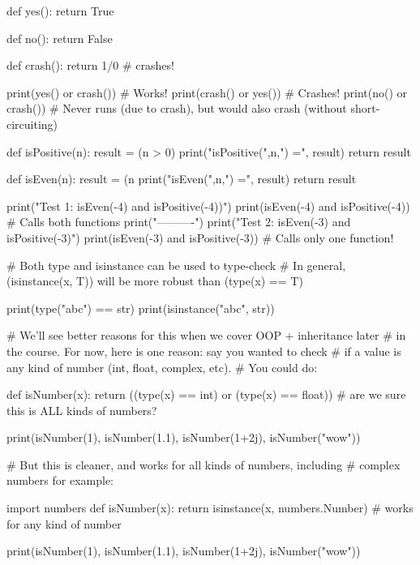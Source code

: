 \begin{runpython}
def yes():
    return True

def no():
    return False

def crash():
    return 1/0 # crashes!

print(yes() or crash()) # Works!
print(crash() or yes()) # Crashes!
print(no() or crash())  # Never runs (due to crash), but would also crash (without short-circuiting)
\end{runpython}

\begin{runpython}
def isPositive(n):
    result = (n > 0)
    print("isPositive(",n,") =", result)
    return result

def isEven(n):
    result = (n %
    print("isEven(",n,") =", result)
    return result

print("Test 1: isEven(-4) and isPositive(-4))")
print(isEven(-4) and isPositive(-4)) # Calls both functions
print("----------")
print("Test 2: isEven(-3) and isPositive(-3)")
print(isEven(-3) and isPositive(-3)) # Calls only one function!
\end{runpython}

\begin{runpython}
# Both type and isinstance can be used to type-check
# In general, (isinstance(x, T)) will be more robust than (type(x) == T)

print(type("abc") == str)
print(isinstance("abc", str))

# We'll see better reasons for this when we cover OOP + inheritance later
# in the course.  For now, here is one reason:  say you wanted to check
# if a value is any kind of number (int, float, complex, etc). 
# You could do:

def isNumber(x):
    return ((type(x) == int) or
            (type(x) == float)) # are we sure this is ALL kinds of numbers?

print(isNumber(1), isNumber(1.1), isNumber(1+2j), isNumber("wow"))

# But this is cleaner, and works for all kinds of numbers, including
# complex numbers for example:

import numbers
def isNumber(x):
    return isinstance(x, numbers.Number) # works for any kind of number

print(isNumber(1), isNumber(1.1), isNumber(1+2j), isNumber("wow"))
\end{runpython}
